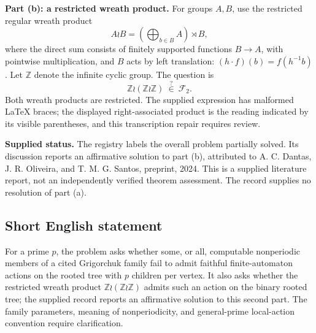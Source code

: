 \documentclass[11pt]{article}
\newcommand{\Z}{\mathbb{Z}}
\begin{document}
\textbf{Part (b): a restricted wreath product.} For groups \(A,B\), use the restricted regular wreath product
\[
A\wr B=\left(\bigoplus_{b\in B}A\right)\rtimes B,
\]
where the direct sum consists of finitely supported functions \(B\to A\), with pointwise multiplication, and \(B\) acts by left translation: \((h\cdot f)(b)=f(h^{-1}b)\). Let \(\Z\) denote the infinite cyclic group. The question is
\[
\Z\wr(\Z\wr\Z)\ \stackrel{?}{\in}\ \mathcal F_2.
\]
Both wreath products are restricted. The supplied expression has malformed LaTeX braces; the displayed right-associated product is the reading indicated by its visible parentheses, and this transcription repair requires review.

\textbf{Supplied status.} The registry labels the overall problem partially solved. Its discussion reports an affirmative solution to part (b), attributed to A. C. Dantas, J. R. Oliveira, and T. M. G. Santos, preprint, 2024. This is a supplied literature report, not an independently verified theorem assessment. The record supplies no resolution of part (a).
\subsection{Short English statement}
For a prime \(p\), the problem asks whether some, or all, computable nonperiodic members of a cited Grigorchuk family fail to admit faithful finite-automaton actions on the rooted tree with \(p\) children per vertex. It also asks whether the restricted wreath product \(\Z\wr(\Z\wr\Z)\) admits such an action on the binary rooted tree; the supplied record reports an affirmative solution to this second part. The family parameters, meaning of nonperiodicity, and general-prime local-action convention require clarification.
\end{document}
